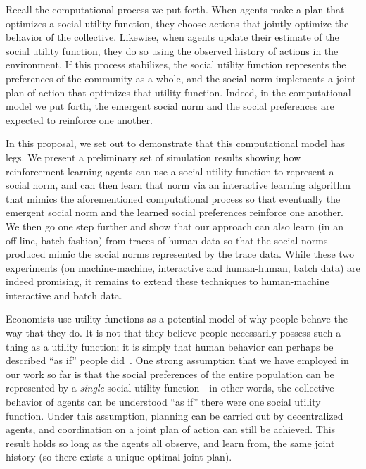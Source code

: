 Recall the computational process we put forth.  When agents make a
plan that optimizes a social utility function, they choose actions
that jointly optimize the behavior of the collective.
Likewise, when
agents update their estimate of the social utility function, they do
so using the observed history of actions in the environment.
If this process stabilizes, the social utility function represents the
preferences of the community as a whole, and the social norm
implements a joint plan of action that optimizes that utility
function.  Indeed, in the computational model we put forth, the
emergent social norm and the social preferences are expected to
reinforce one another.

In this proposal, we set out to demonstrate that this computational
model has legs.  We present a preliminary set of simulation results
showing how reinforcement-learning agents 
can use a social utility function to represent a social norm, and can
then learn that norm via an interactive learning algorithm that mimics
the aforementioned computational process so that eventually the
emergent social norm and the learned social preferences reinforce one
another.  We then go one step further and show that our approach can
also learn (in an off-line, batch fashion) from traces of human data
so that the social norms produced mimic the social norms represented
by the trace data.  While these two experiments (on machine-machine,
interactive and human-human, batch data) are indeed promising, it
remains to extend these techniques to human-machine interactive and
batch data.

Economists use utility functions as a potential model of why people
behave the way that they do.  It is not that they believe people
necessarily possess such a thing as a utility function; it is simply
that human behavior can perhaps be described ``as if'' people
did~\cite{Savage1954}.  One strong assumption that we have employed in
our work so far is that the social preferences of the entire
population can be represented by a \emph{single\/} social utility
function---in other words, the collective behavior of agents can be
understood ``as if'' there were one social utility function.  Under
this assumption, planning can be carried out by decentralized agents,
and coordination on a joint plan of action can still be achieved.
This result holds so long as the agents all observe, and learn from,
the same joint history (so there exists a unique optimal joint plan).

